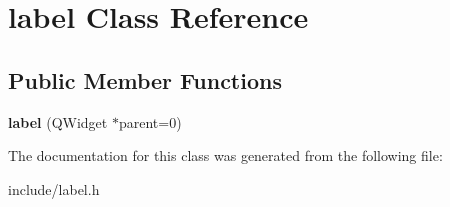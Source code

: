 \hypertarget{classlabel}{\section{label Class Reference}
\label{classlabel}
}
\subsection*{Public Member Functions}
\begin{DoxyCompactItemize}
\item 
\hypertarget{classlabel_a250dc28f9b8f33a4443cfb6ca5fe8dab}{{\bfseries label} (Q\-Widget $\ast$parent=0)}\label{classlabel_a250dc28f9b8f33a4443cfb6ca5fe8dab}

\end{DoxyCompactItemize}


The documentation for this class was generated from the following file\-:\begin{DoxyCompactItemize}
\item 
include/label.\-h\end{DoxyCompactItemize}
